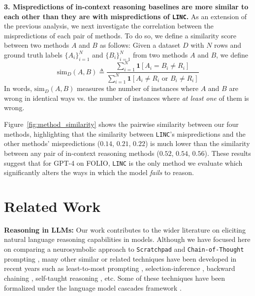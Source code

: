 \documentclass[11pt]{article}
\begin{document}
\textbf{3. Mispredictions of in-context reasoning baselines are more similar to each other than they are with mispredictions of \texttt{LINC}.} As an extension of the previous analysis, we next investigate the correlation between the mispredictions of each pair of methods.
To do so, we define a similarity score between two methods $A$ and $B$ as follows:
Given a dataset $D$ with $N$ rows and ground truth labels $\{A_i\}_{i=1}^N$ and $\{B_i\}_{i=1}^N$ from two methods $A$ and $B$, we define
$$\text{sim}_D(A, B) \triangleq \frac{\sum_{i=1}^N \mathbf{1}\left[ A_i = B_i \ne R_i \right] }{\sum_{i=1}^N \mathbf{1}\left[ A_i \ne R_i \text{ or } B_i \ne R_i\right]}$$
In words, $\text{sim}_D(A,B)$ measures the number of instances where $A$ and $B$ are wrong in identical ways vs. the number of instances where \emph{at least one} of them is wrong.

Figure~\ref{fig:method_similarity} shows the pairwise similarity between our four methods, highlighting that the similarity between \texttt{LINC}'s mispredictions and the other methods' mispredictions ($0.14$, $0.21$, $0.22$) is much lower than the similarity between any pair of in-context reasoning methods ($0.52$, $0.54$, $0.56$). 
These results suggest that for GPT-4 on FOLIO, \texttt{LINC} is the only method we evaluate which significantly alters the ways in which the model \emph{fails} to reason. 

\section{Related Work} \label{sec:related_work}

\textbf{Reasoning in LLMs:} Our work contributes to the wider literature on eliciting natural language reasoning capabilities in models.
Although we have focused here on comparing a neurosymbolic approach to \texttt{Scratchpad} \cite{nye2021show} and \texttt{Chain-of-Thought} prompting \cite{wei2022chain, kojima2022large, wang2022self}, many other similar or related techniques have been developed in recent years such as least-to-most prompting \cite{zhou2022least}, selection-inference \cite{creswell2022selection}, backward chaining \cite{tafjord2022entailer, kazemi2023lambada}, self-taught reasoning \cite{zelikman2022star}, etc. Some of these techniques have been formalized under the language model cascades framework \cite{dohan2022language}.
\end{document}
